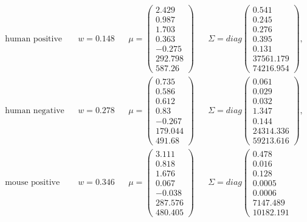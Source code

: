 \begin{align*}
	\text{human positive} && w = 0.148 && \mu = \left(\begin{matrix}
		2.429\\ 0.987\\ 1.703\\ 0.363\\	-0.275\\ 292.798\\ 587.26
	\end{matrix}\right) && \Sigma = diag\left(\begin{matrix}
		0.541\\ 0.245\\ 0.276\\ 0.395\\	0.131\\ 37561.179\\ 74216.954
	\end{matrix}\right),\\
	\text{human negative} && w = 0.278 && \mu = \left(\begin{matrix}
		0.735\\ 0.586\\ 0.612\\ 0.83\\ -0.267\\ 179.044\\ 491.68
	\end{matrix}\right) && \Sigma = diag\left(\begin{matrix}
		0.061\\ 0.029\\ 0.032\\ 1.347\\	0.144\\ 24314.336\\ 59213.616
	\end{matrix}\right),\\
	\text{mouse positive} && w = 0.346 && \mu = \left(\begin{matrix}
		3.111\\ 0.818\\ 1.676\\ 0.067\\ -0.038\\ 287.576\\ 480.405
	\end{matrix}\right) && \Sigma = diag\left(\begin{matrix}
		0.478\\ 0.016\\ 0.128\\ 0.0005\\ 0.0006\\ 7147.489\\ 10182.191

\end{matrix}
\end{align*}
